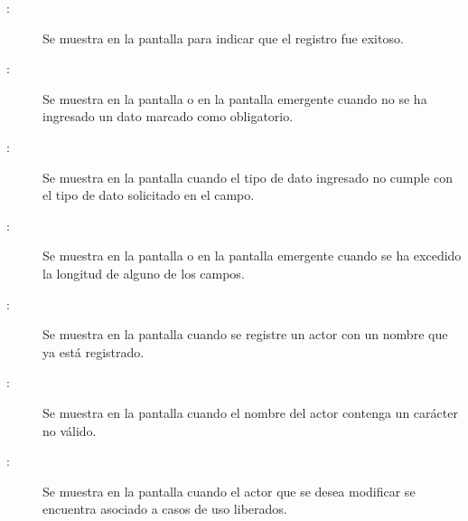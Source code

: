 \begin{description}
	\item[:] Se muestra en la pantalla  para indicar que el registro fue exitoso.
	\item[:] Se muestra en la pantalla  o en la pantalla emergente  cuando no se ha ingresado un dato marcado como obligatorio.
	\item[:] Se muestra en la pantalla  cuando el tipo de dato ingresado no cumple con el tipo de dato solicitado en el campo.
	\item[:] Se muestra en la pantalla  o en la pantalla emergente  cuando se ha excedido la longitud de alguno de los campos.
	\item[:] Se muestra en la pantalla  cuando se registre un actor con un nombre que ya está registrado.
	\item[:] Se muestra en la pantalla  cuando el nombre del actor contenga un carácter no válido.
	\item[:] Se muestra en la pantalla  cuando el actor que se desea modificar se encuentra asociado a casos de uso liberados.
\end{description}
